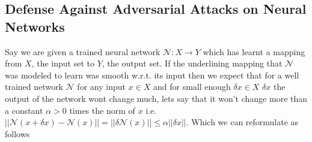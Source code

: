 \newpage
\subsection{Defense Against Adversarial Attacks on Neural Networks}

Say we are given a trained neural network $\mathcal{N}: X \to Y$ which has learnt a mapping from $X$, the input set to $Y$, the output set. If the underlining mapping that $\mathcal{N}$ was modeled to learn was smooth w.r.t. its input then we expect that for a well trained network $\mathcal{N}$ for any input $x\in X$ and for small enough $\delta x \in X$  $\delta x$ the output of the network wont change much, lets say that it won't change more than a constant $\alpha > 0$ times the norm of $x$ i.e. $||\mathcal{N}(x+\delta x) - \mathcal{N}(x)|| = ||\delta \mathcal{N}(x)||\le \alpha ||\delta x||$. Which we can reformulate as follows

